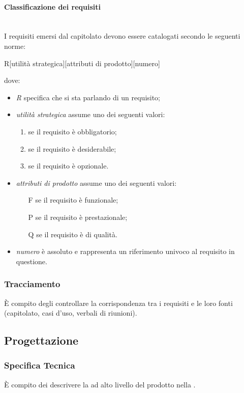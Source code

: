 \paragraph{Classificazione dei requisiti}\mbox{}\\
I requisiti emersi dal capitolato devono essere catalogati secondo le seguenti norme:
\begin{center}
	R[utilità strategica][attributi di prodotto][numero]
\end{center}
dove:
\begin{itemize}
	\item \textit{R} specifica che si sta parlando di un requisito;
	\item \textit{utilità strategica} assume uno dei seguenti valori:
	\begin{enumerate}
	\item se il requisito è obbligatorio;
	\item se il requisito è desiderabile;
	\item se il requisito è opzionale.
	\end{enumerate}
	\item \textit{attributi di prodotto} assume uno dei seguenti valori:
	\begin{itemize}
		\item [F] se il requisito è funzionale;
		\item [P] se il requisito è prestazionale;
		\item [Q] se il requisito è di qualità.
	\end{itemize}
	\item \textit{numero} è assoluto e rappresenta un riferimento univoco al requisito in questione.
\end{itemize}

\subsubsection{Tracciamento}
\`{E} compito degli \Analisti{} controllare la corrispondenza tra i requisiti e le loro fonti (capitolato, casi d'uso, verbali di riunioni).

\subsection{Progettazione}
\subsubsection{Specifica Tecnica}
\`{E} compito dei \Progettisti{} descrivere la \PA{} ad alto livello del prodotto nella \SpecificaTecnica.

